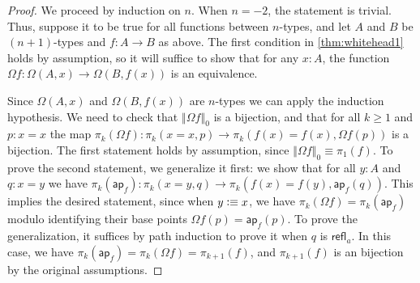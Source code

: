 \documentclass[10pt,a4paper]{article}
\newcommand{\jdeq}{\equiv}      %
\newcommand{\defeq}{\vcentcolon\equiv}  %
\newcommand{\refl}[1]{\ensuremath{\mathsf{refl}_{#1}}\xspace}
\newcommand{\mapfunc}[1]{\ensuremath{\mathsf{ap}_{#1}}\xspace} %
\let\apfunc\mapfunc
\newcommand{\trunc}[2]{\mathopen{}\left\Vert #2\right\Vert_{#1}\mathclose{}}
\theoremstyle{definition}
\theoremstyle{remark}
\numberwithin{equation}{section}
\begin{document}
\begin{proof}
  We proceed by induction on $n$.
  When $n=-2$, the statement is trivial.
  Thus, suppose it to be true for all functions between $n$-types, and let $A$ and $B$ be $(n+1)$-types and $f:A\to B$ as above.
  The first condition in \cref{thm:whitehead1} holds by assumption, so it will suffice to show that for any $x:A$, the function $\Omega f: \Omega(A,x) \to \Omega(B,f(x))$ is an equivalence.

  Since $\Omega(A,x)$ and $\Omega(B,f(x))$ are $n$-types we can apply the induction hypothesis.
  We need to check that $\trunc 0{\Omega f}$ is a bijection, and that for all $k\geq1$ and $p : x = x$ the map $\pi_k(\Omega f):\pi_k(x = x,p) \to \pi_k(f(x) = f(x),\Omega f(p))$ is a bijection.
  The first statement holds by assumption, since $\trunc 0{\Omega f} \jdeq \pi_1(f)$.
  To prove the second statement, we generalize it first: we show that for all $y : A$ and $q : x = y$ we have $\pi_k(\apfunc f):\pi_k(x = y,q) \to \pi_k(f(x) = f(y),\apfunc f(q))$.
  This implies the desired statement, since when $y\defeq x$, we have $\pi_k(\Omega f)=\pi_k(\apfunc f)$ modulo identifying their base points $\Omega f(p)=\apfunc f(p)$.
  To prove the generalization, it suffices by path induction to prove it when $q$ is $\refl{a}$.
  In this case, we have $\pi_k(\apfunc f) = \pi_k(\Omega f) = \pi_{k+1}(f)$, and $\pi_{k+1}(f)$ is an bijection by the original assumptions.
\end{proof}



\end{document}

